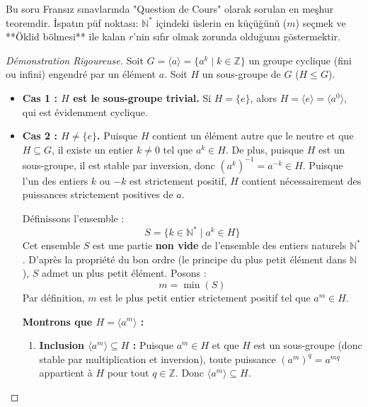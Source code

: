 \documentclass[12pt,a4paper]{report}
\begin{document}
\begin{tcolorbox}[colback=yellow!5!white,colframe=orange!80!black,title=Sınav İpucu : Sınavlarda En Çok Çıkan Teori İspatı !]
Bu soru Fransız sınavlarında "Question de Cours" olarak sorulan en meşhur teoremdir. İspatın püf noktası: $\mathbb{N}^*$ içindeki üslerin en küçüğünü ($m$) seçmek ve **Öklid bölmesi** ile kalan $r$'nin sıfır olmak zorunda olduğunu göstermektir.
\end{tcolorbox}

\begin{proof}[Démonstration Rigoureuse]
Soit $G = \langle a \rangle = \{ a^k \mid k \in \mathbb{Z} \}$ un groupe cyclique (fini ou infini) engendré par un élément $a$.
Soit $H$ un sous-groupe de $G$ ($H \leq G$).

\begin{itemize}
    \item \textbf{Cas 1 : $H$ est le sous-groupe trivial.}  
    Si $H = \{e\}$, alors $H = \langle e \rangle = \langle a^0 \rangle$, qui est évidemment cyclique.
    
    \item \textbf{Cas 2 : $H \neq \{e\}$.}  
    Puisque $H$ contient un élément autre que le neutre et que $H \subseteq G$, il existe un entier $k \neq 0$ tel que $a^k \in H$.  
    De plus, puisque $H$ est un sous-groupe, il est stable par inversion, donc $(a^k)^{-1} = a^{-k} \in H$.  
    Puisque l'un des entiers $k$ ou $-k$ est strictement positif, $H$ contient nécessairement des puissances strictement positives de $a$.
    
    Définissons l'ensemble :
    \[ S = \{ k \in \mathbb{N}^* \mid a^k \in H \} \]
    Cet ensemble $S$ est une partie \textbf{non vide} de l'ensemble des entiers naturels $\mathbb{N}^*$.  
    D'après la propriété du bon ordre (le principe du plus petit élément dans $\mathbb{N}$), $S$ admet un plus petit élément.  
    Posons :
    \[ m = \min(S) \]
    Par définition, $m$ est le plus petit entier strictement positif tel que $a^m \in H$.
    
    \textbf{Montrons que $H = \langle a^m \rangle$ :}
    \begin{enumerate}
        \item \textbf{Inclusion $\langle a^m \rangle \subseteq H$ :}  
        Puisque $a^m \in H$ et que $H$ est un sous-groupe (donc stable par multiplication et inversion), toute puissance $(a^m)^q = a^{mq}$ appartient à $H$ pour tout $q \in \mathbb{Z}$. Donc $\langle a^m \rangle \subseteq H$.
        

\end{enumerate}
\end{itemize}
\end{proof}
\end{document}
